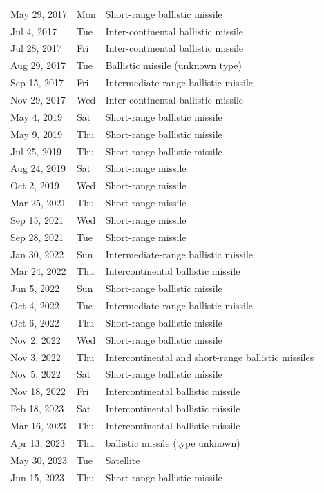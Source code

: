 \documentclass[12pt,letterpaper]{scrartcl}
\begin{document}
\begin{longtable}[c]{lll}
May 29, 2017 & Mon & Short-range ballistic missile \\
Jul 4, 2017 & Tue & Inter-continental ballistic missile \\
Jul 28, 2017 & Fri & Inter-continental ballistic missile \\
Aug 29, 2017 & Tue & Ballistic missile (unknown type) \\
Sep 15, 2017 & Fri & Intermediate-range ballistic missile \\
Nov 29, 2017 & Wed & Inter-continental ballistic missile \\
May 4, 2019 & Sat & Short-range ballistic missile \\
May 9, 2019 & Thu & Short-range ballistic missile \\
Jul 25, 2019 & Thu & Short-range ballistic missile \\
Aug 24, 2019 & Sat & Short-range missile \\
Oct 2, 2019 & Wed & Short-range missile \\
Mar 25, 2021 & Thu & Short-range missile \\
Sep 15, 2021 & Wed & Short-range missile \\
Sep 28, 2021 & Tue & Short-range missile \\
Jan 30, 2022 & Sun & Intermediate-range ballistic missile \\
Mar 24, 2022 & Thu & Intercontinental ballistic missile \\
Jun 5, 2022 & Sun & Short-range ballistic missile \\
Oct 4, 2022 & Tue & Intermediate-range ballistic missile \\
Oct 6, 2022 & Thu & Short-range ballistic missile \\
Nov 2, 2022 & Wed & Short-range ballistic missile \\
Nov 3, 2022 & Thu & Intercontinental and short-range ballistic missiles \\
Nov 5, 2022 & Sat & Short-range ballistic missile \\
Nov 18, 2022 & Fri & Intercontinental ballistic missile \\
Feb 18, 2023 & Sat & Intercontinental ballistic missile \\
Mar 16, 2023 & Thu & Intercontinental ballistic missile \\
Apr 13, 2023 & Thu & ballistic missile (type unknown) \\
May 30, 2023 & Tue & Satellite \\
Jun 15, 2023 & Thu & Short-range ballistic missile \\
\end{longtable}
\end{document}
